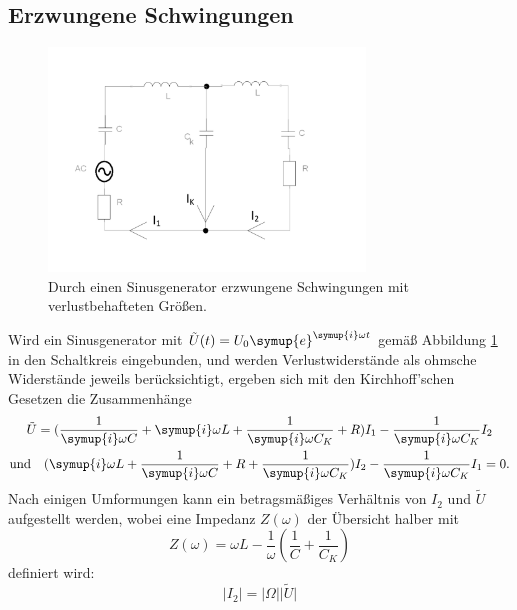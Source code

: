 \subsection{Erzwungene Schwingungen}
\label{subsec:erzwungen}
\FloatBarrier
\begin{figure}
    \centering
    \includegraphics[width=0.75\textwidth]{plots/gekop_schw_kreis1.pdf}
    \caption{Durch einen Sinusgenerator erzwungene Schwingungen mit verlustbehafteten Größen.}
    \label{fig:gezwung-sinus}
\end{figure}
Wird ein Sinusgenerator mit ${\tilde{U}(t)=U_0 \symup{e}^{\symup{i}\omega t}}$ gemäß Abbildung \ref{fig:gezwung-sinus} in den Schaltkreis 
eingebunden, und werden Verlustwiderstände als ohmsche Widerstände jeweils berücksichtigt, ergeben sich mit den Kirchhoff'schen 
Gesetzen die Zusammenhänge 
\begin{gather}
    \tilde{U}=(\frac{1}{\symup{i}\omega C} +  \symup{i} \omega L + \frac{1}{\symup{i}\omega C_K} + R)I_1 - \frac{1}{\symup{i}\omega C_K} I_2 \\
    \text{und} \quad (\symup{i}\omega L + \frac{1}{\symup{i}\omega C} + R+ \frac{1}{\symup{i}\omega C_K}) I_2 - \frac{1}{\symup{i}\omega C_K}I_1 =0 \text{.}
\end{gather}
Nach einigen Umformungen kann ein betragsmäßiges Verhältnis von $I_2$ und $\tilde{U}$ aufgestellt werden, wobei eine Impedanz ${Z(\omega)}$ 
der Übersicht halber mit 
\begin{equation*}
    Z(\omega) = \omega L - \frac{1}{\omega} (\frac{1}{C} + \frac{1}{C_K})    
\end{equation*}
definiert wird:
\begin{equation}
    \lvert I_2 \rvert = \lvert \Omega \rvert \lvert \tilde{U} \rvert 
    \label{eqn:wichtig}
\end{equation}
